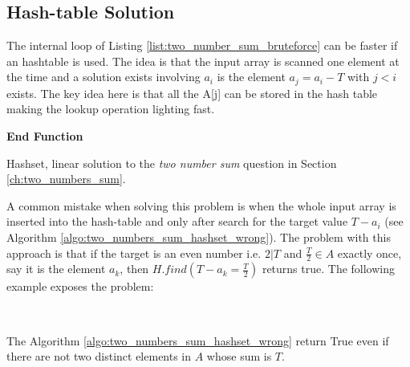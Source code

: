 \subsection{Hash-table Solution}
The internal loop of Listing \ref{list:two_number_sum_bruteforce} can be faster if an hashtable is used. The idea is that the input array is scanned one element at the time and a solution exists involving $a_i$ is the element $a_j  = a_i-T$ with $j < i$ exists. The key idea here is that all the A[j] can be stored in the hash table making the lookup operation lighting fast. 
\begin{algorithm}[H]
	
    \textbf{End Function}

	\label{algo:two_number_sum_hashset}
	\caption{Hashset, linear solution to the \textit{two number sum} question in Section \ref{ch:two_numbers_sum}.}
\end{algorithm}





A common mistake when solving this problem is when the whole input array is inserted into the hash-table and only after search for the target value $T-a_i$ (see Algorithm \ref{algo:two_numbers_sum_hashset_wrong}). The problem with this approach is that if the target is an even number i.e. $ 2 | T$ and $\frac{T}{2} \in A$ exactly once, say it is the element $a_k$, then $H.find(T-a_k=\frac{T}{2})$ returns true. The following example exposes the problem:
\begin{example}
	\\ \hfill
	\begin{itemize}
		\item[] $A=\{1,2,5,4}\}$
	\item[] $T = 10$
\end{itemize}
The Algorithm \ref{algo:two_numbers_sum_hashset_wrong} return True even if there are not two distinct elements in $A$ whose sum is $T$.
\end{example}



